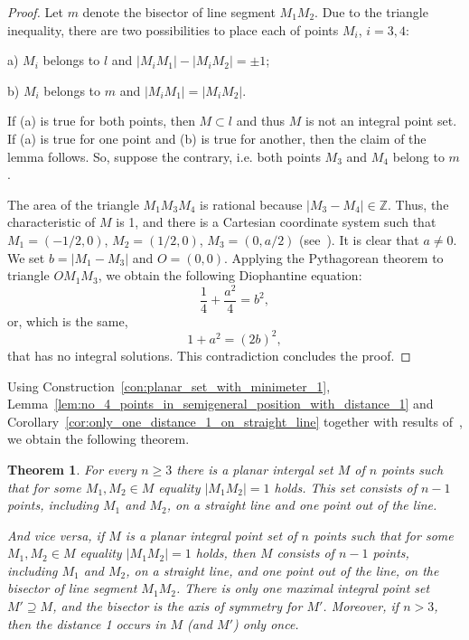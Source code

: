 \documentclass[a4paper,14pt]{article} %
\theoremstyle{plain}
\newtheorem{theorem}{Theorem}[section]
\theoremstyle{definition}
\begin{document}
\begin{proof}
	Let $m$ denote the bisector of line segment $M_1 M_2$.
	Due to the triangle inequality, there are two possibilities to place each of points $M_i$, $i=3,4$:

	a) $M_i$ belongs to $l$ and $|M_i M_1|-|M_i M_2| = \pm 1$;

	b) $M_i$ belongs to $m$ and $|M_i M_1| = |M_i M_2|$.

	If (a) is true for both points, then $M\subset l$ and thus $M$ is not an integral point set.
	If (a) is true for one point and (b) is true for another, then the claim of the lemma follows.
	So, suppose the contrary, i.e. both points $M_3$ and $M_4$ belong to $m$.

	The area of the triangle $M_1 M_3 M_4$ is rational because $|M_3 - M_4| \in \mathbb{Z}$.
	Thus, the characteristic of $M$ is 1,
	and there is a Cartesian coordinate system such that $M_1=(-1/2,0)$, $M_2=(1/2,0)$, $M_3=(0, a/2)$
	(see~\cite[Theorem 4]{our-vmmsh-2018}).
	It is clear that $a\neq 0$.
	We set $b = |M_1 - M_3|$ and $O=(0,0)$.
	Applying the Pythagorean theorem to triangle $OM_1M_3$, we obtain the following Diophantine equation:
	\begin{equation}
		\frac{1}{4} + \frac{a^2}{4} = b^2
		,
	\end{equation}
	or, which is the same,
	\begin{equation}
		1 + a^2 = (2b)^2
		,
	\end{equation}
	that has no integral solutions.
	This contradiction concludes the proof.
\end{proof}

Using Construction~\ref{con:planar_set_with_minimeter_1},
Lemma~\ref{lem:no_4_points_in_semigeneral_position_with_distance_1} and Corollary~\ref{cor:only_one_distance_1_on_straight_line}
together with results of~\cite[Section 6]{antonov2008maximal},
we obtain the following theorem.

\begin{theorem}
	\label{thm:minimeter_1_planar}
	For every $n\geq 3$ there is a planar intergal set $M$ of $n$ points
	such that for some $M_1,M_2 \in M$ equality $|M_1 M_2|=1$ holds.
	This set consists of $n-1$ points, including $M_1$ and $M_2$, on a straight line and one point out of the line.

	And vice versa, if $M$ is a planar integral point set of $n$ points
	such that for some $M_1,M_2 \in M$ equality $|M_1 M_2|=1$ holds,
	then $M$ consists of $n-1$ points, including $M_1$ and $M_2$, on a straight line,
	and one point out of the line, on the bisector of line segment $M_1 M_2$.
	There is only one maximal integral point set $M' \supseteq M$,
	and the bisector is the axis of symmetry for $M'$.
	Moreover, if $n > 3$, then the distance 1 occurs in $M$ (and $M'$) only once.
\end{theorem}
\end{document}
